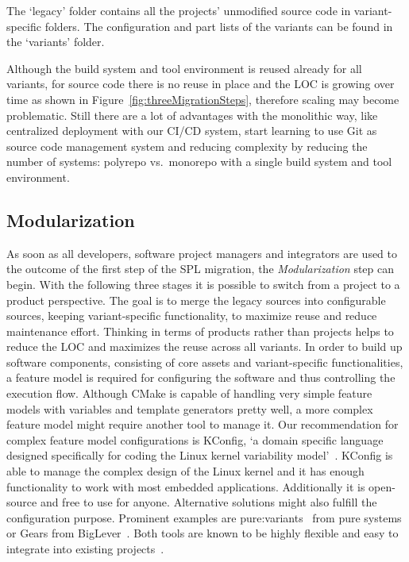 The `legacy' folder contains all the projects' unmodified source code in
variant-specific folders. The configuration and part lists of the variants can
be found in the `variants' folder.

Although the build system and tool environment is reused already for all
variants, for source code there is no reuse in place and the LOC is growing over
time as shown in Figure~\ref{fig:threeMigrationSteps}, therefore scaling may
become problematic. Still there are a lot of advantages with the monolithic way,
like centralized deployment with our CI/CD system, start learning to use Git as
source code management system and reducing complexity by reducing the number of
systems: polyrepo vs.\ monorepo with a single build system and tool environment.

\subsection{Modularization}\label{modularization}

As soon as all developers, software project managers and integrators are used to
the outcome of the first step of the SPL migration, the \textit{Modularization}
step can begin. With the following three stages it is possible to switch from a
project to a product perspective. The goal is to merge the legacy sources into
configurable sources, keeping variant-specific functionality, to maximize reuse
and reduce maintenance effort. Thinking in terms of products rather than
projects helps to reduce the LOC and maximizes the reuse across all variants. In
order to build up software components, consisting of core assets and
variant-specific functionalities, a feature model is required for configuring
the software and thus controlling the execution flow. Although CMake is capable
of handling very simple feature models with variables and template generators
pretty well, a more complex feature model might require another tool to manage
it. Our recommendation for complex feature model configurations is KConfig, `a
domain specific language designed specifically for coding the Linux kernel
variability model'~\cite[page 3]{kconfigKernel}. KConfig is able to manage the
complex design of the Linux kernel and it has enough functionality to work with
most embedded applications. Additionally it is open-source and free to use for
anyone. Alternative solutions might also fulfill the configuration purpose.
Prominent examples are pure:variants~\cite{pureVariantsPureSystems} from pure
systems or Gears from BigLever~\cite{gearsBigLever}. Both tools are known to be
highly flexible and easy to integrate into existing
projects~\cite{confsplcGrunerBKR20}.

